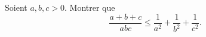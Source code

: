 Soient $a, b, c > 0$. Montrer que
\[ \frac{a + b + c}{abc} \leq \frac{1}{a^2} + \frac{1}{b^2} + \frac{1}{c^2}. \]
